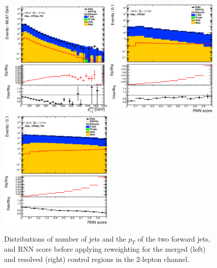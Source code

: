 \begin{figure}[ht]
    \includegraphics[width=0.48\textwidth]{figures/2lep/reweighting/before_reweighting/C_0ptag2pjet_0ptv_CRVjet_Fid_PtTagResJets_Log.eps}
    \includegraphics[width=0.48\textwidth]{figures/2lep/reweighting/before_reweighting/C_0ptag1pfat0pjet_0ptv_CRVjet_RNNScoreMerged_Log.eps}
    \includegraphics[width=0.48\textwidth]{figures/2lep/reweighting/before_reweighting/C_0ptag2pjet_0ptv_CRVjet_Fid_RNNScoreResolved_Log.eps}
    \caption{ Distributions of number of jets and the $p_T$ of the two forward jets, and RNN score before applying reweighting for the merged (left) and resolved (right) control regions in the 2-lepton channel.}
    \label{fig:before_rw}
\end{figure}

